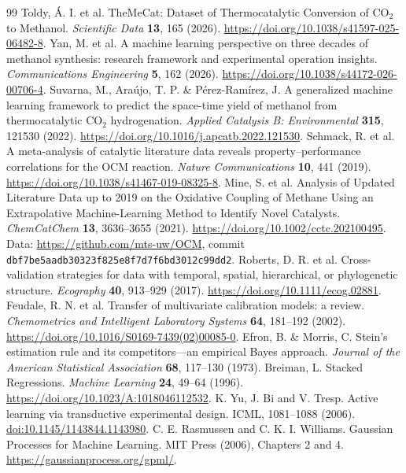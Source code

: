 \begin{thebibliography}{99}\small
{} Toldy, \'A. I. et al. TheMeCat: Dataset of Thermocatalytic Conversion of CO$_2$ to Methanol. \emph{Scientific Data} \textbf{13}, 165 (2026). \url{https://doi.org/10.1038/s41597-025-06482-8}.
 Yan, M. et al. A machine learning perspective on three decades of methanol synthesis: research framework and experimental operation insights. \emph{Communications Engineering} \textbf{5}, 162 (2026). \url{https://doi.org/10.1038/s44172-026-00706-4}.
 Suvarna, M., Ara\'ujo, T. P. \& P\'erez-Ram\'irez, J. A generalized machine learning framework to predict the space-time yield of methanol from thermocatalytic CO$_2$ hydrogenation. \emph{Applied Catalysis B: Environmental} \textbf{315}, 121530 (2022). \url{https://doi.org/10.1016/j.apcatb.2022.121530}.
 Schmack, R. et al. A meta-analysis of catalytic literature data reveals property--performance correlations for the OCM reaction. \emph{Nature Communications} \textbf{10}, 441 (2019). \url{https://doi.org/10.1038/s41467-019-08325-8}.
 Mine, S. et al. Analysis of Updated Literature Data up to 2019 on the Oxidative Coupling of Methane Using an Extrapolative Machine-Learning Method to Identify Novel Catalysts. \emph{ChemCatChem} \textbf{13}, 3636--3655 (2021). \url{https://doi.org/10.1002/cctc.202100495}. Data: \url{https://github.com/mts-uw/OCM}, commit \texttt{dbf7be5aadb30323f825e8f7d7f6bd3012c99dd2}.
 Roberts, D. R. et al. Cross-validation strategies for data with temporal, spatial, hierarchical, or phylogenetic structure. \emph{Ecography} \textbf{40}, 913--929 (2017). \url{https://doi.org/10.1111/ecog.02881}.
 Feudale, R. N. et al. Transfer of multivariate calibration models: a review. \emph{Chemometrics and Intelligent Laboratory Systems} \textbf{64}, 181--192 (2002). \url{https://doi.org/10.1016/S0169-7439(02)00085-0}.
 Efron, B. \& Morris, C. Stein's estimation rule and its competitors---an empirical Bayes approach. \emph{Journal of the American Statistical Association} \textbf{68}, 117--130 (1973).
 Breiman, L. Stacked Regressions. \emph{Machine Learning} \textbf{24}, 49--64 (1996). \url{https://doi.org/10.1023/A:1018046112532}.
 K. Yu, J. Bi and V. Tresp. Active learning via transductive experimental design. ICML, 1081--1088 (2006). \href{https://doi.org/10.1145/1143844.1143980}{doi:10.1145/1143844.1143980}.
 C. E. Rasmussen and C. K. I. Williams. Gaussian Processes for Machine Learning. MIT Press (2006), Chapters 2 and 4. \url{https://gaussianprocess.org/gpml/}.

\end{thebibliography}
